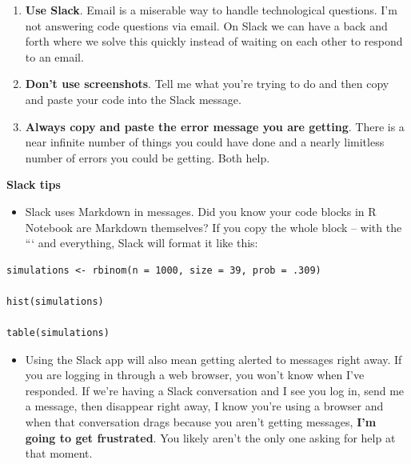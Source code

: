 \documentclass[
]{book}
\providecommand{\tightlist}{%
  \setlength{\itemsep}{0pt}\setlength{\parskip}{0pt}}
\begin{document}
\begin{enumerate}
\def\labelenumi{\arabic{enumi}.}
\tightlist
\item
  \textbf{Use Slack}. Email is a miserable way to handle technological questions. I'm not answering code questions via email. On Slack we can have a back and forth where we solve this quickly instead of waiting on each other to respond to an email.
\item
  \textbf{Don't use screenshots}. Tell me what you're trying to do and then copy and paste your code into the Slack message.
\item
  \textbf{Always copy and paste the error message you are getting}. There is a near infinite number of things you could have done and a nearly limitless number of errors you could be getting. Both help.
\end{enumerate}

\textbf{Slack tips}

\begin{itemize}
\tightlist
\item
  Slack uses Markdown in messages. Did you know your code blocks in R Notebook are Markdown themselves? If you copy the whole block -- with the ``` and everything, Slack will format it like this:
\end{itemize}

\begin{verbatim}
simulations <- rbinom(n = 1000, size = 39, prob = .309)

hist(simulations)

table(simulations)
\end{verbatim}

\begin{itemize}
\tightlist
\item
  Using the Slack app will also mean getting alerted to messages right away. If you are logging in through a web browser, you won't know when I've responded. If we're having a Slack conversation and I see you log in, send me a message, then disappear right away, I know you're using a browser and when that conversation drags because you aren't getting messages, \textbf{I'm going to get frustrated}. You likely aren't the only one asking for help at that moment.
\end{itemize}

  
\end{document}
